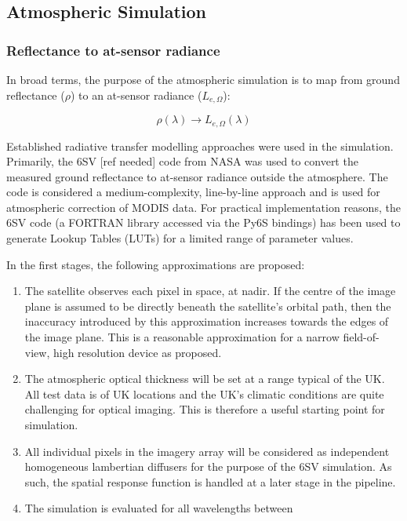\documentclass[10pt,a4paper,final,twocolumn]{article}
\begin{document}
\subsection{Atmospheric Simulation}
\subsubsection{Reflectance to at-sensor radiance}
In broad terms, the purpose of the atmospheric simulation is to map from ground reflectance ($\rho$) to an at-sensor radiance ($L_{e, \Omega}$):

\begin{equation}
\rho(\lambda) \rightarrow L_{e, \Omega} (\lambda)
\end{equation}

Established radiative transfer modelling approaches were used in the simulation. Primarily, the 6SV [ref needed] code from NASA was used to convert the measured ground reflectance to at-sensor radiance outside the atmosphere. The code is considered a medium-complexity, line-by-line approach and is used for atmospheric correction of MODIS data. For practical implementation reasons, the 6SV code (a FORTRAN library accessed via the Py6S bindings) has been used to generate Lookup Tables (LUTs) for a limited range of parameter values.

In the first stages, the following approximations are proposed:
\begin{enumerate}
\item The satellite observes each pixel in space, at nadir. If the centre of the image plane is assumed to be directly beneath the satellite's orbital path, then the inaccuracy introduced by this approximation increases towards the edges of the image plane. This is a reasonable approximation for a narrow field-of-view, high resolution device as proposed. 
\item The atmospheric optical thickness will be set at a range typical of the UK. All test data is of UK locations and the UK's climatic conditions are quite challenging for optical imaging. This is therefore a useful starting point for simulation.
\item All individual pixels in the imagery array will be considered as independent homogeneous lambertian diffusers for the purpose of the 6SV simulation. As such, the spatial response function is handled at a later stage in the pipeline.
\item The simulation is evaluated for all wavelengths between 
\end{enumerate}
\end{document}
